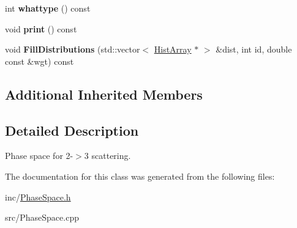 \begin{DoxyCompactItemize}
\item 
\hypertarget{classPS__2__3_ab7105d8734ec97b22c0104bd451d619b}{int {\bfseries whattype} () const }\label{classPS__2__3_ab7105d8734ec97b22c0104bd451d619b}

\item 
\hypertarget{classPS__2__3_a98b7559fbc72002c2dd6dadb1db9be0b}{void {\bfseries print} () const }\label{classPS__2__3_a98b7559fbc72002c2dd6dadb1db9be0b}

\item 
\hypertarget{classPS__2__3_a13e50836a67fad996eb544614f569a60}{void {\bfseries Fill\-Distributions} (std\-::vector$<$ \hyperlink{classHistArray}{Hist\-Array} $\ast$ $>$ \&dist, int id, double const \&wgt) const }\label{classPS__2__3_a13e50836a67fad996eb544614f569a60}

\end{DoxyCompactItemize}
\subsection*{Additional Inherited Members}


\subsection{Detailed Description}
Phase space for 2-\/$>$3 scattering. 

The documentation for this class was generated from the following files\-:\begin{DoxyCompactItemize}
\item 
inc/\hyperlink{PhaseSpace_8h}{Phase\-Space.\-h}\item 
src/Phase\-Space.\-cpp\end{DoxyCompactItemize}
